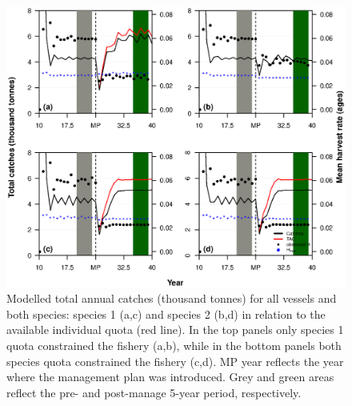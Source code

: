 \documentclass[12pt,oneline,a4paper,numbib]{ouparticle}
\numberwithin{equation}{subsection} %
\begin{document}
\begin{figure}[!ht]
\centering
\includegraphics[width=\textwidth]{Figures/Catches.eps} 
\caption{Modelled total annual catches (thousand tonnes) for all vessels and both species: species 1 (a,c) and species 2 (b,d) in relation to the available individual quota (red line). In the top panels only species 1 quota constrained the fishery (a,b), while in the bottom panels both species quota constrained the fishery (c,d). MP year reflects the year where the management plan was introduced. Grey and green areas reflect the pre- and post-manage 5-year period, respectively.}
\label{f:catches}
\end{figure}
\end{document}
